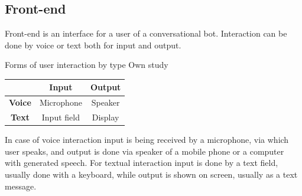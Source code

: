 \subsection*{Front-end}

Front-end is an interface for a user of a conversational bot.
Interaction can be done by voice or text both for input and output.

\mttable
{Forms of user interaction by type}
{Own study}
{
    \begin{tabular}{|c|c|c|}
        \hline
        & \textbf{Input} & \textbf{Output} \\
        \hline
        \textbf{Voice} & Microphone & Speaker \\
        \hline
        \textbf{Text} & Input field & Display \\
        \hline
    \end{tabular}
}

In case of voice interaction input is being received by a microphone, via which user speaks, and output is done via speaker of a mobile phone or a computer with generated speech.
For textual interaction input is done by a text field, usually done with a keyboard, while output is shown on screen, usually as a text message.


